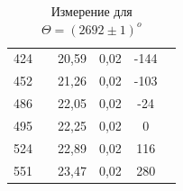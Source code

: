 \documentclass[a4paper,12pt]{report}
\begin{document}
\begin{table}[H]
\begin{tabular}{|c|c|c|c|c|c|}
424 &                     & 20,59 & 0,02 & -144 &                     \\ \cline{1-1} \cline{3-5}
452 &                     & 21,26 & 0,02 & -103 &                     \\ \cline{1-1} \cline{3-5}
486 &                     & 22,05 & 0,02 & -24  &                     \\ \cline{1-1} \cline{3-5}
495 &                     & 22,25 & 0,02 & 0    &                     \\ \cline{1-1} \cline{3-5}
524 &                     & 22,89 & 0,02 & 116  &                     \\ \cline{1-1} \cline{3-5}
551 &                     & 23,47 & 0,02 & 280  &                     \\ \hline
\end{tabular}
\caption{Измерение для $\Theta = (2692\pm 1) ^{o}$}
\end{table}
\end{document}
